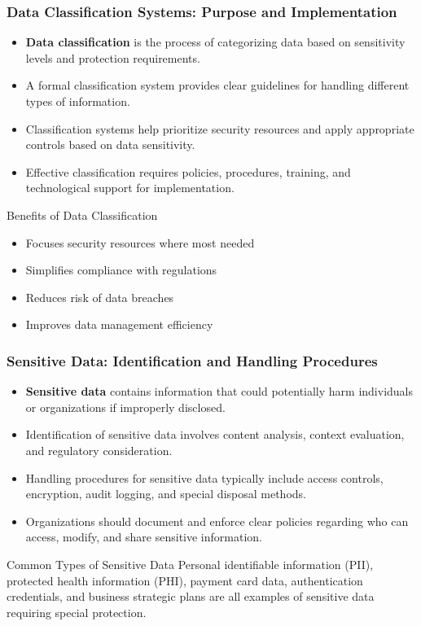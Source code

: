 \documentclass{beamer}
\begin{document}
\begin{frame}
\frametitle{Data Classification Systems: Purpose and Implementation}
\begin{itemize}
\item \textbf{Data classification} is the process of categorizing data based on sensitivity levels and protection requirements.
\item A formal classification system provides clear guidelines for handling different types of information.
\item Classification systems help prioritize security resources and apply appropriate controls based on data sensitivity.
\item Effective classification requires policies, procedures, training, and technological support for implementation.
\end{itemize}

\begin{block}{Benefits of Data Classification}
\begin{itemize}
\item Focuses security resources where most needed
\item Simplifies compliance with regulations
\item Reduces risk of data breaches
\item Improves data management efficiency
\end{itemize}
\end{block}
\end{frame}

\begin{frame}
\frametitle{Sensitive Data: Identification and Handling Procedures}
\begin{itemize}
\item \textbf{Sensitive data} contains information that could potentially harm individuals or organizations if improperly disclosed.
\item Identification of sensitive data involves content analysis, context evaluation, and regulatory consideration.
\item Handling procedures for sensitive data typically include access controls, encryption, audit logging, and special disposal methods.
\item Organizations should document and enforce clear policies regarding who can access, modify, and share sensitive information.
\end{itemize}

\begin{exampleblock}{Common Types of Sensitive Data}
Personal identifiable information (PII), protected health information (PHI), payment card data, authentication credentials, and business strategic plans are all examples of sensitive data requiring special protection.
\end{exampleblock}
\end{frame}
\end{document}
